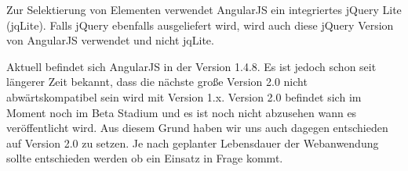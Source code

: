 Zur Selektierung von Elementen verwendet AngularJS ein integriertes jQuery Lite (jqLite).
Falls jQuery ebenfalls ausgeliefert wird, wird auch diese jQuery Version von AngularJS verwendet und nicht jqLite.

Aktuell befindet sich AngularJS in der Version 1.4.8.
Es ist jedoch schon seit längerer Zeit bekannt, dass die nächste große Version 2.0 nicht abwärtskompatibel sein wird mit Version 1.x.
Version 2.0 befindet sich im Moment noch im Beta Stadium und es ist noch nicht abzusehen wann es veröffentlicht wird.
Aus diesem Grund haben wir uns auch dagegen entschieden auf Version 2.0 zu setzen.
Je nach geplanter Lebensdauer der Webanwendung sollte entschieden werden ob ein Einsatz in Frage kommt.
